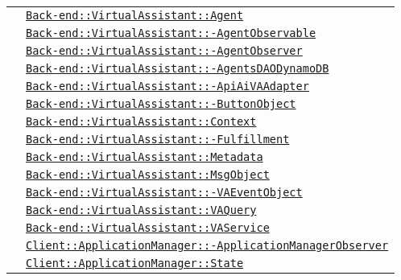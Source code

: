 \begin{longtable}{|>{\centering}m{3cm}|m{10cm}<{\centering}|}
& \hyperref[Back-end::VirtualAssistant::Agent]{\texttt{Back-end::VirtualAssistant::Agent}}\\
& \hyperref[Back-end::VirtualAssistant::AgentObservable]{\texttt{Back-end::VirtualAssistant::-\linebreak AgentObservable}}\\
& \hyperref[Back-end::VirtualAssistant::AgentObserver]{\texttt{Back-end::VirtualAssistant::-\linebreak AgentObserver}}\\
& \hyperref[Back-end::VirtualAssistant::AgentsDAODynamoDB]{\texttt{Back-end::VirtualAssistant::-\linebreak AgentsDAODynamoDB}}\\
& \hyperref[Back-end::VirtualAssistant::ApiAiVAAdapter]{\texttt{Back-end::VirtualAssistant::-\linebreak ApiAiVAAdapter}}\\
& \hyperref[Back-end::VirtualAssistant::ButtonObject]{\texttt{Back-end::VirtualAssistant::-\linebreak ButtonObject}}\\
& \hyperref[Back-end::VirtualAssistant::Context]{\texttt{Back-end::VirtualAssistant::Context}}\\
& \hyperref[Back-end::VirtualAssistant::Fulfillment]{\texttt{Back-end::VirtualAssistant::-\linebreak Fulfillment}}\\
& \hyperref[Back-end::VirtualAssistant::Metadata]{\texttt{Back-end::VirtualAssistant::Metadata}}\\
& \hyperref[Back-end::VirtualAssistant::MsgObject]{\texttt{Back-end::VirtualAssistant::MsgObject}}\\
& \hyperref[Back-end::VirtualAssistant::VAEventObject]{\texttt{Back-end::VirtualAssistant::-\linebreak VAEventObject}}\\
& \hyperref[Back-end::VirtualAssistant::VAQuery]{\texttt{Back-end::VirtualAssistant::VAQuery}}\\
& \hyperref[Back-end::VirtualAssistant::VAService]{\texttt{Back-end::VirtualAssistant::VAService}}\\
& \hyperref[Client::ApplicationManager::ApplicationManagerObserver]{\texttt{Client::ApplicationManager::-\linebreak ApplicationManagerObserver}}\\
& \hyperref[Client::ApplicationManager::State]{\texttt{Client::ApplicationManager::State}}\\

\end{longtable}
